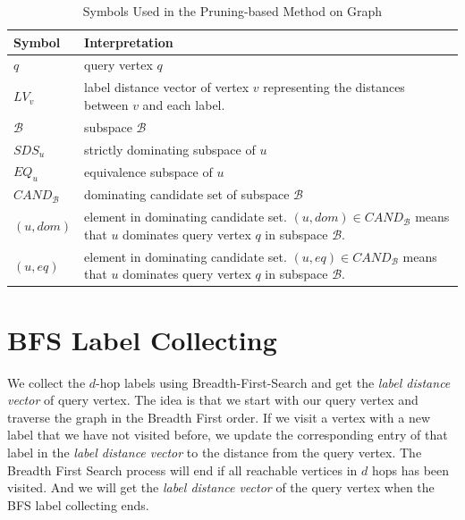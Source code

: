 \begin{table}[h]
\centering
\begin{tabular}{|l|p{11cm}|}
\hline
Symbol                      & Interpretation                                                                                                                                     \\ \hline
$q$                         & query vertex $q$                                                                                                                                   \\ \hline
$LV_v$                      & label distance vector of vertex $v$ representing the distances between $v$ and each label.                                                         \\ \hline
$\mathcal{B}$               & subspace $\mathcal{B}$                                                                                                                             \\ \hline
$\mathit{SDS}_u$            & strictly dominating subspace of $u$                                                                                                                \\ \hline
$\mathit{EQ}_u$             & equivalence subspace of $u$                                                                                                                        \\ \hline
$\mathit{CAND}_\mathcal{B}$ & dominating candidate set of subspace $\mathcal{B}$                                                                                                 \\ \hline
$(u, dom)$                  & element in dominating candidate set. $(u, dom) \in \mathit{CAND}_\mathcal{B}$ means that $u$ dominates query vertex $q$ in subspace $\mathcal{B}$. \\ \hline
$(u, eq)$                   & element in dominating candidate set. $(u, eq) \in \mathit{CAND}_\mathcal{B}$ means that $u$ dominates query vertex $q$ in subspace $\mathcal{B}$.  \\ \hline
\end{tabular}
    \caption{Symbols Used in the Pruning-based Method on Graph}
    \label{tab:symbol_graph}
\end{table}

\section{BFS Label Collecting}
\label{sec:bfs-collect}
We collect the $d$-hop labels using Breadth-First-Search and get the \emph{label distance vector} of query vertex. The idea is that we start with our query vertex and traverse the graph in the Breadth First order. If we visit a vertex with a new label that we have not visited before, we update the corresponding entry of that label in the \emph{label distance vector} to the distance from the query vertex. The Breadth First Search process will end if all reachable vertices in $d$ hops has been visited. And we will get the \emph{label distance vector} of the query vertex when the BFS label collecting ends.

